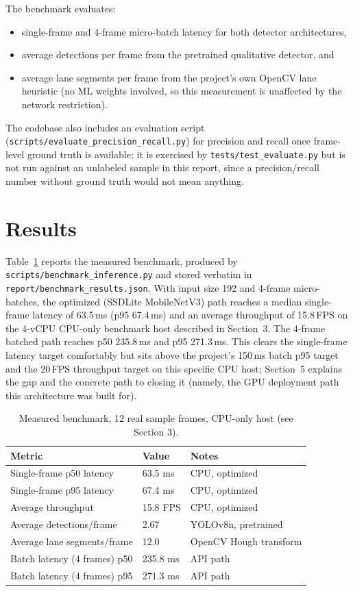 \documentclass[10pt,twocolumn]{article}
\begin{document}
The benchmark evaluates:
\begin{itemize}
  \item single-frame and 4-frame micro-batch latency for both detector architectures,
  \item average detections per frame from the pretrained qualitative detector, and
  \item average lane segments per frame from the project's own OpenCV lane heuristic (no ML weights involved, so this measurement is unaffected by the network restriction).
\end{itemize}
The codebase also includes an evaluation script (\texttt{scripts/evaluate\_precision\_recall.py}) for precision and recall once frame-level ground truth is available; it is exercised by \texttt{tests/test\_evaluate.py} but is not run against an unlabeled sample in this report, since a precision/recall number without ground truth would not mean anything.

\section{Results}
Table~\ref{tab:results} reports the measured benchmark, produced by \texttt{scripts/benchmark\_inference.py} and stored verbatim in \texttt{report/benchmark\_results.json}. With input size 192 and 4-frame micro-batches, the optimized (SSDLite MobileNetV3) path reaches a median single-frame latency of 63.5\,ms (p95 67.4\,ms) and an average throughput of 15.8\,FPS on the 4-vCPU CPU-only benchmark host described in Section~3. The 4-frame batched path reaches p50 235.8\,ms and p95 271.3\,ms. This clears the single-frame latency target comfortably but sits above the project's 150\,ms batch p95 target and the 20\,FPS throughput target on this specific CPU host; Section~5 explains the gap and the concrete path to closing it (namely, the GPU deployment path this architecture was built for).

\begin{table}[t]
\small
\centering
\caption{Measured benchmark, 12 real sample frames, CPU-only host (see Section 3).}
\label{tab:results}
\begin{tabular}{@{}p{}p{}p{}@{}}
\toprule
Metric & Value & Notes \\
\midrule
Single-frame p50 latency & 63.5 ms & CPU, optimized \\
Single-frame p95 latency & 67.4 ms & CPU, optimized \\
Average throughput & 15.8 FPS & CPU, optimized \\
Average detections/frame & 2.67 & YOLOv8n, pretrained \\
Average lane segments/frame & 12.0 & OpenCV Hough transform \\
Batch latency (4 frames) p50 & 235.8 ms & API path \\
Batch latency (4 frames) p95 & 271.3 ms & API path \\
\bottomrule
\end{tabular}
\end{table}
\end{document}
